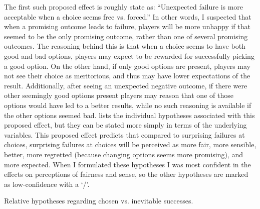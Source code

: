 The first such proposed effect is roughly state as: ``Unexpected failure is more acceptable when a choice seems free vs\@. forced.''
%
In other words, I suspected that when a promising outcome leads to failure, players will be more unhappy if that seemed to be the only promising outcome, rather than one of several promising outcomes.
%
The reasoning behind this is that when a choice seems to have both good and bad options, players may expect to be rewarded for successfully picking a good option.
%
On the other hand, if only good options are present, players may not see their choice as meritorious, and thus may have lower expectations of the result.
%
Additionally, after seeing an unexpected negative outcome, if there were other seemingly good options present players may reason that one of those options would have led to a better results, while no such reasoning is available if the other options seemed bad.
%
 lists the individual hypotheses associated with this proposed effect, but they can be stated more simply in terms of the underlying variables.
%
This proposed effect predicts that compared to surprising failures at \obv{} choices, surprising failures at  choices will be perceived as more fair, more sensible, better, more regretted (because changing options seems more promising), and more expected.
%
When I formulated these hypotheses I was most confident in the effects on perceptions of fairness and sense, so the other hypotheses are marked as low-confidence with a `\lc/'.


\begin{table}[!h]
\centering
\bgroup
\def\arraystretch{1.3}
\setlength{\tabcolsep}{0.6em}

\egroup
\caption[Retrospective chosen vs\@. inevitable success hypotheses]{Relative hypotheses regarding chosen vs\@. inevitable successes.}
  \label{tab:e2-chosen-vs-inevitable-success-hypotheses}
\end{table}


